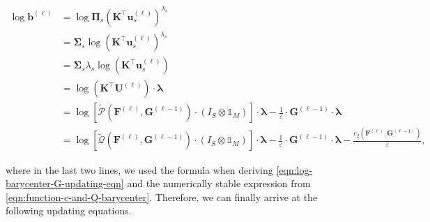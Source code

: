 \begin{equation}\label{eqn:updating-eqn-for-logb-by-P-and-Q}
  \begin{aligned}
    \log \mathbf{b}^{(\ell)}
     & = \log\boldsymbol\Pi_{s} \left(\mathbf{K}^\top \mathbf{u}_s^{(\ell)}\right)^{\lambda_s}   \\
     & = \boldsymbol\Sigma_s \log \left(\mathbf{K}^\top \mathbf{u}^{(\ell)}_s\right)^{\lambda_s} \\
     & = \boldsymbol\Sigma_s \lambda_s \log \left(\mathbf{K}^\top \mathbf{u}^{(\ell)}_s\right)   \\
     & = \log \left(\mathbf{K}^\top \mathbf{U}^{(\ell)}\right) \cdot \boldsymbol\lambda          \\
     & = \log \left[
      \widetilde{\mathcal{P}} \left(\mathbf{F}^{(\ell)}, \mathbf{G}^{(\ell-1)}\right)
      \cdot \left(I_S \otimes \mathbb{1}_M\right)
      \right]
    \cdot \boldsymbol \lambda
    - \frac1\varepsilon \cdot \mathbf{G}^{(\ell-1)} \cdot \boldsymbol \lambda                    \\
     & = \log \left[
      \widetilde{\mathcal{Q}} \left(\mathbf{F}^{(\ell)}, \mathbf{G}^{(\ell-1)}\right)
      \cdot \left(I_S \otimes \mathbb{1}_M\right)
      \right] \cdot \boldsymbol \lambda
    - \frac1\varepsilon \cdot \mathbf{G}^{(\ell-1)} \cdot \boldsymbol \lambda
    - \frac{c_2 \left(\mathbf{F}^{(\ell)}, \mathbf{G}^{(\ell-1)}\right)}\varepsilon,
  \end{aligned}
\end{equation}

where in the last two lines, we used the formula when deriving \cref{eqn:log-barycenter-G-updating-eqn}
and the numerically stable expression from \cref{eqn:function-c-and-Q-barycenter}.
Therefore, we can finally arrive at the following updating equations.

